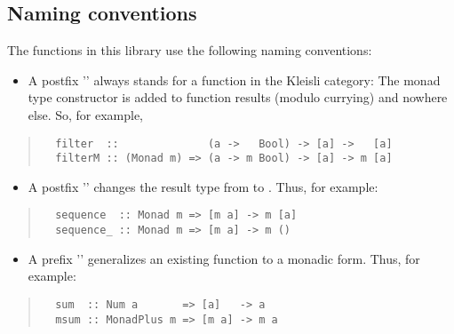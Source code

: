 \subsection{Naming conventions
}
The functions in this library use the following naming conventions: 
\par
\begin{itemize}
\item
 A postfix '' always stands for a function in the Kleisli category:
  The monad type constructor  is added to function results
  (modulo currying) and nowhere else.  So, for example, 
\par

\end{itemize}
\begin{quote}
{\haddockverb\begin{verbatim}
  filter  ::              (a ->   Bool) -> [a] ->   [a]
  filterM :: (Monad m) => (a -> m Bool) -> [a] -> m [a]
\end{verbatim}}
\end{quote}
\begin{itemize}
\item
 A postfix '' changes the result type from  to .
  Thus, for example: 
\par

\end{itemize}
\begin{quote}
{\haddockverb\begin{verbatim}
  sequence  :: Monad m => [m a] -> m [a] 
  sequence_ :: Monad m => [m a] -> m () 
\end{verbatim}}
\end{quote}
\begin{itemize}
\item
 A prefix '' generalizes an existing function to a monadic form.
  Thus, for example: 
\par

\end{itemize}
\begin{quote}
{\haddockverb\begin{verbatim}
  sum  :: Num a       => [a]   -> a
  msum :: MonadPlus m => [m a] -> m a
\end{verbatim}}
\end{quote}

